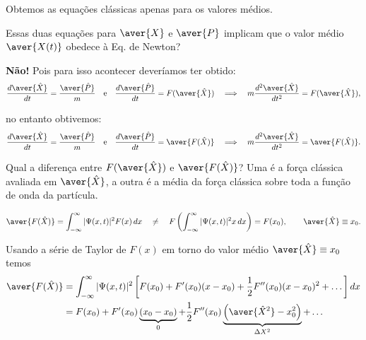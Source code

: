 Obtemos as equações clássicas apenas para os valores médios.

Essas duas equações para $\aver{X}$ e $\aver{P}$ implicam que o valor médio $\aver{X(t)}$ obedece à Eq. de Newton?

\textbf{Não!} Pois para isso acontecer deveríamos ter obtido:
\begin{equation}
    \frac{d\aver{\hat{X}}}{dt} = \frac{\aver{\hat{P}}}{m} \quad \text{e} \quad \frac{d\aver{\hat{P}}}{dt} = F(\aver{\hat{X}}) \quad \Longrightarrow \quad m\frac{d^2\aver{\hat{X}}}{dt^2} = F(\aver{\hat{X}}),
\label{eq:aula15_newton_desejado}
\end{equation}

no entanto obtivemos:
\begin{equation}
    \frac{d\aver{\hat{X}}}{dt} = \frac{\aver{\hat{P}}}{m} \quad \text{e} \quad \frac{d\aver{\hat{P}}}{dt} = \aver{F(\hat{X})} \quad \Longrightarrow \quad m\frac{d^2\aver{\hat{X}}}{dt^2} = \aver{F(\hat{X})}.
\label{eq:aula15_newton_obtido}
\end{equation}

Qual a diferença entre $F(\aver{\hat{X}})$ e $\aver{F(\hat{X})}$? Uma é a força clássica avaliada em $\aver{\hat{X}}$, a outra é a média da força clássica sobre toda a função de onda da partícula.

\begin{equation}
    \aver{F(\hat{X})} = \int_{-\infty}^{\infty} |\Psi(x,t)|^2 F(x) \, dx \quad \neq \quad F\left(\int_{-\infty}^{\infty} |\Psi(x,t)|^2 x \, dx\right) = F(x_0), \qquad \aver{\hat{X}} \equiv x_0.
\label{eq:aula15_F_media_vs_F_de_media}
\end{equation}

Usando a série de Taylor de $F(x)$ em torno do valor médio $\aver{\hat{X}} \equiv x_0$ temos
\begin{align}
    \aver{F(\hat{X})} &= \int_{-\infty}^{\infty} |\Psi(x,t)|^2 \left[ F(x_0) + F'(x_0)(x - x_0) + \frac{1}{2}F''(x_0)(x-x_0)^2 + \dots \right] dx \notag \\
    &= F(x_0) + F'(x_0)\underbrace{(x_0 - x_0)}_{0} + \frac{1}{2}F''(x_0)\underbrace{\left(\aver{\hat{X}^2} - x_0^2\right)}_{\Delta X^2} + \dots
\label{eq:aula15_taylor_F}
\end{align}

\begin{center}
\end{center}

